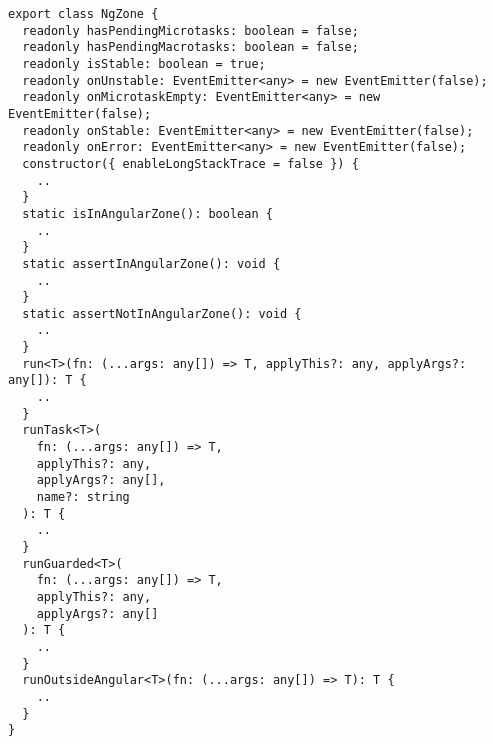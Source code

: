 \begin{verbatim}
export class NgZone {
  readonly hasPendingMicrotasks: boolean = false;
  readonly hasPendingMacrotasks: boolean = false;
  readonly isStable: boolean = true;
  readonly onUnstable: EventEmitter<any> = new EventEmitter(false);
  readonly onMicrotaskEmpty: EventEmitter<any> = new EventEmitter(false);
  readonly onStable: EventEmitter<any> = new EventEmitter(false);
  readonly onError: EventEmitter<any> = new EventEmitter(false);
  constructor({ enableLongStackTrace = false }) {
    ..
  }
  static isInAngularZone(): boolean {
    ..
  }
  static assertInAngularZone(): void {
    ..
  }
  static assertNotInAngularZone(): void {
    ..
  }
  run<T>(fn: (...args: any[]) => T, applyThis?: any, applyArgs?: any[]): T {
    ..
  }
  runTask<T>(
    fn: (...args: any[]) => T,
    applyThis?: any,
    applyArgs?: any[],
    name?: string
  ): T {
    ..
  }
  runGuarded<T>(
    fn: (...args: any[]) => T,
    applyThis?: any,
    applyArgs?: any[]
  ): T {
    ..
  }
  runOutsideAngular<T>(fn: (...args: any[]) => T): T {
    ..
  }
}
\end{verbatim}
